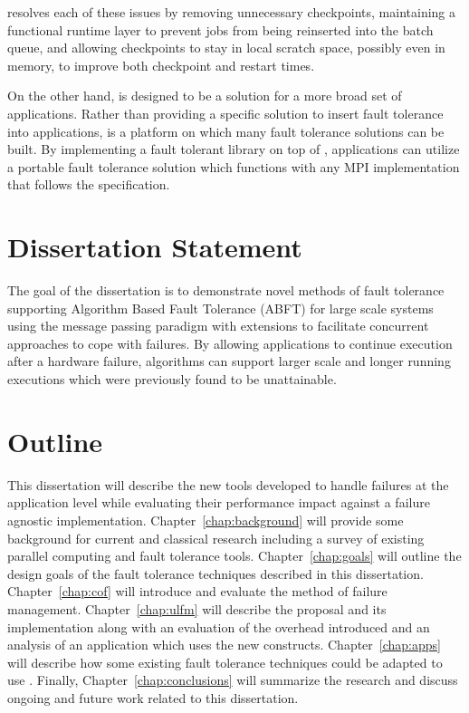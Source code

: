 \cof resolves each of these issues by removing unnecessary 
checkpoints, maintaining a functional runtime layer to prevent jobs from being 
reinserted into the batch queue, and allowing checkpoints to stay in local 
scratch space, possibly even in memory, to improve both checkpoint and restart times.

On the other hand, \ulfm is designed to be a solution for a more broad set of 
applications. Rather than providing a specific solution to insert fault 
tolerance into applications, \ulfm is a platform on which many fault tolerance 
solutions can be built. By implementing a fault tolerant library on top of 
\ulfm, applications can utilize a portable fault tolerance solution which 
functions with any MPI implementation that follows the specification.

\section{Dissertation Statement}\label{sect:intro:dissertation}

The goal of the dissertation is to demonstrate novel methods of fault tolerance
supporting Algorithm Based Fault Tolerance (ABFT) for large scale systems using
the message passing paradigm with extensions to facilitate concurrent approaches
to cope with failures. By allowing applications to continue execution after a
hardware failure, algorithms can support larger scale and longer running
executions which were previously found to be unattainable.

\section{Outline}\label{sect:intro:outline}

This dissertation will describe the new tools developed to handle failures at
the application level while evaluating their performance impact against a
failure agnostic \mpi implementation. Chapter~\ref{chap:background} will provide 
some background for current and classical
research including a survey of existing parallel computing and fault tolerance 
tools. Chapter~\ref{chap:goals} will outline the design goals of the fault 
tolerance techniques described in this dissertation.
Chapter~\ref{chap:cof} will introduce and evaluate the \cof method of failure
management. Chapter~\ref{chap:ulfm} will describe the \ulfm proposal and its
implementation along with an evaluation of the overhead introduced and an 
analysis of an application which uses the new \ulfm constructs.
Chapter~\ref{chap:apps} will describe how some existing fault tolerance 
techniques could be adapted to use \ulfm. Finally, 
Chapter~\ref{chap:conclusions} will summarize the research 
and discuss ongoing and future work related to this dissertation.

